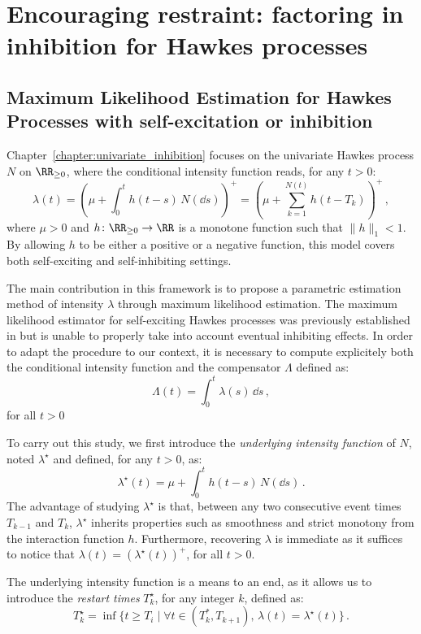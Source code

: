 \section{Encouraging restraint: factoring in inhibition for Hawkes processes}\label{sec:chap0_inhibition}
    \subsection{Maximum Likelihood Estimation for Hawkes Processes with self-excitation or inhibition}
        Chapter~\ref{chapter:univariate_inhibition} focuses on the univariate Hawkes process $N$ on $\RR_{\geq0}$, where the conditional intensity function reads, for any $t>0$:
        \[\lambda(t) = \left(\mu + \int_{0}^{t}{h(t-s)\,N(\dd s)}\right)^+ = \left(\mu + \sum_{k=1}^{N(t)}{h(t - T_k)}\right)^+\,,\]
        where $\mu > 0$ and $h\colon \RR_{\geq 0} \to \RR$ is a monotone function such that $\|h\|_1 < 1$. 
        By allowing $h$ to be either a positive or a negative function, this model covers both self-exciting and self-inhibiting settings.

        The main contribution in this framework is to propose a parametric estimation method of intensity $\lambda$ through maximum likelihood estimation. 
        The maximum likelihood estimator for self-exciting Hawkes processes was previously established in \textcite{Ozaki1979} but is unable to properly take into account eventual inhibiting effects. 
        In order to adapt the procedure to our context, it is necessary to compute explicitely both the conditional intensity function and the compensator $\Lambda$ defined as:
        \[\Lambda(t) = \int_{0}^{t}{\lambda(s)\,\dd s}\,,\]
        for all $t>0$

        To carry out this study, we first introduce the \textit{underlying intensity function} of $N$, noted $\lambda^\star$ and defined, for any $t>0$, as:
        \[\lambda^\star(t) = \mu + \int_{0}^{t}{h(t-s)\,N(\dd s)}\,.\]
        The advantage of studying $\lambda^\star$ is that, between any two consecutive event times $T_{k-1}$ and $T_k$, $\lambda^\star$ inherits properties such as smoothness and strict monotony from the interaction function $h$.
        Furthermore, recovering $\lambda$ is immediate as it suffices to notice that $\lambda(t) = \left(\lambda^\star(t)\right)^+$, for all $t>0$. 

        The underlying intensity function is a means to an end, as it allows us to introduce the \textit{restart times} $T_k^\star$, for any integer $k$, defined as:
        \[T_k^\star = \inf{\{t\geq T_i\mid \forall t\in(T_k^*,T_{k+1}),\, \lambda(t) = \lambda^\star(t)\}}\,.\]


